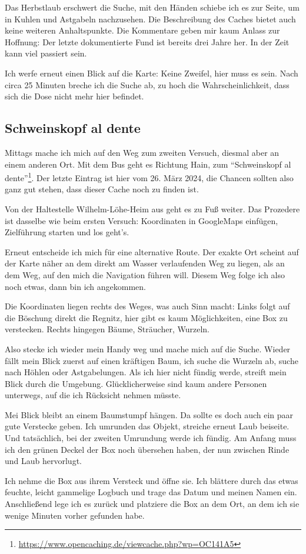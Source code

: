 Das Herbstlaub erschwert die Suche, mit den Händen schiebe ich es zur Seite, um in Kuhlen und Astgabeln nachzusehen. Die Beschreibung des Caches bietet auch keine weiteren Anhaltspunkte. Die Kommentare geben mir kaum Anlass zur Hoffnung: Der letzte dokumentierte Fund ist bereits drei Jahre her. In der Zeit kann viel passiert sein.

Ich werfe erneut einen Blick auf die Karte: Keine Zweifel, hier muss es sein. Nach circa 25 Minuten breche ich die Suche ab, zu hoch die Wahrscheinlichkeit, dass sich die Dose nicht mehr hier befindet.

\subsection*{Schweinskopf al dente}
Mittags mache ich mich auf den Weg zum zweiten Versuch, diesmal aber an einem anderen Ort. Mit dem Bus geht es Richtung Hain, zum \enquote{Schweinskopf al dente}\footnote{\url{https://www.opencaching.de/viewcache.php?wp=OC141A5}}. Der letzte Eintrag ist hier vom 26. März 2024, die Chancen sollten also ganz gut stehen, dass dieser Cache noch zu finden ist.

Von der Haltestelle Wilhelm-Löhe-Heim aus geht es zu Fuß weiter. Das Prozedere ist dasselbe wie beim ersten Versuch: Koordinaten in GoogleMaps einfügen, Zielführung starten und los geht's.

Erneut entscheide ich mich für eine alternative Route. Der exakte Ort scheint auf der Karte näher an dem direkt am Wasser verlaufenden Weg zu liegen, als an dem Weg, auf den mich die Navigation führen will. Diesem Weg folge ich also noch etwas, dann bin ich angekommen.

Die Koordinaten liegen rechts des Weges, was auch Sinn macht: Links folgt auf die Böschung direkt die Regnitz, hier gibt es kaum Möglichkeiten, eine Box zu verstecken. Rechts hingegen Bäume, Sträucher, Wurzeln.

Also stecke ich wieder mein Handy weg und mache mich auf die Suche. Wieder fällt mein Blick zuerst auf einen kräftigen Baum, ich suche die Wurzeln ab, suche nach Höhlen oder Astgabelungen. Als ich hier nicht fündig werde, streift mein Blick durch die Umgebung. Glücklicherweise sind kaum andere Personen unterwegs, auf die ich Rücksicht nehmen müsste.

Mei Blick bleibt an einem Baumstumpf hängen. Da sollte es doch auch ein paar gute Verstecke geben. Ich umrunden das Objekt, streiche erneut Laub beiseite. Und tatsächlich, bei der zweiten Umrundung werde ich fündig. Am Anfang muss ich den grünen Deckel der Box noch übersehen haben, der nun zwischen Rinde und Laub hervorlugt.

Ich nehme die Box aus ihrem Versteck und öffne sie. Ich blättere durch das etwas feuchte, leicht gammelige Logbuch und trage das Datum und meinen Namen ein. Anschließend lege ich es zurück und platziere die Box an dem Ort, an dem ich sie wenige Minuten vorher gefunden habe.